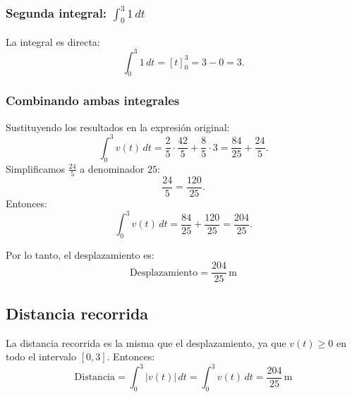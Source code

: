 \subsubsection*{Segunda integral: \( \int_{0}^{3} 1 \, dt \)}

La integral es directa:
\[
\int_{0}^{3} 1 \, dt = \left[ t \right]_{0}^{3} = 3 - 0 = 3.
\]

\subsubsection*{Combinando ambas integrales}

Sustituyendo los resultados en la expresión original:
\[
\int_{0}^{3} v(t) \, dt = \frac{2}{5} \cdot \frac{42}{5} + \frac{8}{5} \cdot 3 = \frac{84}{25} + \frac{24}{5}.
\]
Simplificamos \( \frac{24}{5} \) a denominador \( 25 \):
\[
\frac{24}{5} = \frac{120}{25}.
\]
Entonces:
\[
\int_{0}^{3} v(t) \, dt = \frac{84}{25} + \frac{120}{25} = \frac{204}{25}.
\]

Por lo tanto, el desplazamiento es:
\[\boxed{
\text{Desplazamiento} = \frac{204}{25} \, \text{m}}
\]

\subsection*{Distancia recorrida}

La distancia recorrida es la misma que el desplazamiento, ya que \( v(t) \geq 0 \) en todo el intervalo \( [0, 3] \). Entonces:
\[
\text{Distancia} = \int_{0}^{3} |v(t)| \, dt = \int_{0}^{3} v(t) \, dt = \boxed{ \frac{204}{25} \, \text{m}}
\]
